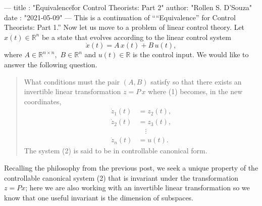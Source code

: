 ---
title :   "\"Equivalence\" for Control Theorists: Part 2"
author:   "Rollen S. D'Souza"
date  :   "2021-05-09"
---
This is a continuation of ````Equivalence'' for Control Theorists: Part 1.''
Now let us move to a problem of linear control theory.
Let \(x(t) \in \mathbb{R}^n\) be a state that evolves according to the linear control system
\begin{equation}
  \label{eqn:system}
  \dot{x}(t) = A\, x(t) + B\, u(t),
\end{equation}
where \(A \in \mathbb{R}^{n\times n},\) \(B \in \mathbb{R}^n\) and \(u(t) \in \mathbb{R}\) is the control input.
We would like to answer the following question.
%
\begin{quote}
  What conditions must the pair \((A, B)\) satisfy so that there exists an invertible linear transformation \(z = P\, x\) where (1) becomes, in the new coordinates,
  \begin{equation}
  \label{eqn:controllablesystem}
  \begin{aligned}
    \dot{z}_1(t) &= z_2(t),\\
    \dot{z}_2(t) &= z_3(t),\\
                 &\quad\vdots \\
    \dot{z}_n(t) &= u(t).
  \end{aligned}
  \end{equation}
  The system (2) is said to be in controllable canonical form.
\end{quote}
%
Recalling the philosophy from the previous post, we seek a unique property of the controllable canonical system (2) that is invariant under the transformation \(z = P x\);
here we are also working with an invertible linear transformation so we know that one useful invariant is the dimension of subspaces.

